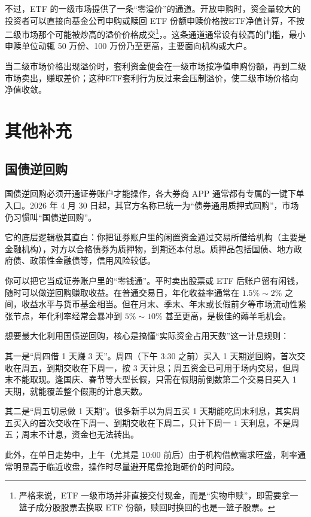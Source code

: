 \documentclass[12pt,openany]{book}
\begin{document}
不过，ETF 的一级市场提供了一条“零溢价”的通道。开放申购时，资金量较大的投资者可以直接向基金公司申购或赎回 ETF 份额申赎价格按ETF净值计算，不按二级市场那个可能被炒高的溢价价格成交\footnote{严格来说，ETF 一级市场并非直接交付现金，而是“实物申赎”，即需要拿一篮子成分股股票去换取 ETF 份额，赎回时换回的也是一篮子股票。}，。这条通道通常设有较高的门槛，最小申赎单位动辄 50 万份、100 万份乃至更高，主要面向机构或大户。

当二级市场价格出现溢价时，套利资金便会在一级市场按净值申购份额，再到二级市场卖出，赚取差价；这种ETF套利行为反过来会压制溢价，使二级市场价格向净值收敛。

\section{其他补充}

\subsection{国债逆回购}

国债逆回购必须开通证券账户才能操作，各大券商 APP 通常都有专属的一键下单入口。2026 年 4 月 30 日起，其官方名称已统一为“债券通用质押式回购”，市场仍习惯叫“国债逆回购”。

它的底层逻辑极其直白：你把证券账户里的闲置资金通过交易所借给机构（主要是金融机构），对方以合格债券为质押物，到期还本付息。质押品包括国债、地方政府债、政策性金融债等，信用风险较低。

你可以把它当成证券账户里的“零钱通”。平时卖出股票或 ETF 后账户留有闲钱，随时可以做逆回购赚取收益。在普通交易日，年化收益率通常在 $1.5\%\sim 2\%$ 之间，收益水平与货币基金相当。但在月末、季末、年末或长假前夕等市场流动性紧张节点，年化利率经常会暴冲到 $5\%\sim 10\%$ 甚至更高，是极佳的薅羊毛机会。

想要最大化利用国债逆回购，核心是搞懂“实际资金占用天数”这一计息规则：

其一是“周四借 1 天赚 $3$ 天”。周四（下午 3:30 之前）买入 1 天期逆回购，首次交收在周五，到期交收在下周一，按 3 天计息；周五资金已可用于场内交易，但周末不能取现。逢国庆、春节等大型长假，只需在假期前倒数第二个交易日买入 1 天期，就能覆盖整个假期的计息天数。

其二是“周五切忌做 1 天期”。很多新手以为周五买 1 天期能吃周末利息，其实周五买入的首次交收在下周一、到期交收在下周二，只计下周一 $1$ 天利息，不是周五；周末不计息，资金也无法转出。

此外，在单日走势中，上午（尤其是 10:00 前后）由于机构借款需求旺盛，利率通常明显高于临近收盘，操作时尽量避开尾盘抢跑砸价的时间段。
\end{document}
